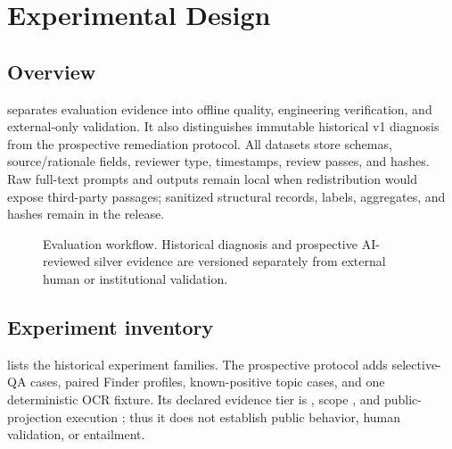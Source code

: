 \chapter{Experimental Design}
\label{ch:experiments}

\section{Overview}

 separates evaluation evidence into offline quality, engineering verification, and external-only validation. It also distinguishes immutable historical v1 diagnosis from the prospective remediation protocol. All datasets store schemas, source/rationale fields, reviewer type, timestamps, review passes, and hashes. Raw full-text prompts and outputs remain local when redistribution would expose third-party passages; sanitized structural records, labels, aggregates, and hashes remain in the release.

\begin{figure}[htbp]
\centering
\resizebox{0.99\textwidth}{!}{}
\caption[Evaluation workflow and evidence boundary.]{Evaluation workflow. Historical diagnosis and prospective AI-reviewed silver evidence are versioned separately from external human or institutional validation.}
\label{fig:evaluation-workflow}
\end{figure}

\section{Experiment inventory}

 lists the historical experiment families. The prospective protocol adds \VTwoQATestCases{} selective-QA cases, \VTwoFinderTestProfiles{} paired Finder profiles, \VTwoTopicTestCases{} known-positive topic cases, and one deterministic OCR fixture. Its declared evidence tier is \VTwoEvidenceTier{}, scope \VTwoEvaluationScope{}, and public-projection execution \VTwoPublicProjectionExercised{}; thus it does not establish public behavior, human validation, or entailment.

